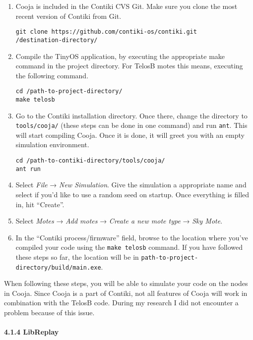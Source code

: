 \begin{enumerate}
\def\labelenumi{\arabic{enumi}.}
\item
  Cooja is included in the Contiki CVS Git. Make sure you clone the most
  recent version of Contiki from Git.

\begin{verbatim}
git clone https://github.com/contiki-os/contiki.git
/destination-directory/
\end{verbatim}
\item
  Compile the TinyOS application, by executing the appropriate make
  command in the project directory. For TelosB motes this means,
  executing the following command.

\begin{verbatim}
cd /path-to-project-directory/
make telosb
\end{verbatim}
\item
  Go to the Contiki installation directory. Once there, change the
  directory to \texttt{tools/cooja/} (these steps can be done in one
  command) and run \texttt{ant}. This will start compiling Cooja. Once
  it is done, it will greet you with an empty simulation environment.

\begin{verbatim}
cd /path-to-contiki-directory/tools/cooja/
ant run
\end{verbatim}
\item
  Select \emph{File} → \emph{New Simulation}. Give the simulation a
  appropriate name and select if you'd like to use a random seed on
  startup. Once everything is filled in, hit ``Create''.
\item
  Select \emph{Motes} → \emph{Add motes} → \emph{Create a new mote type}
  → \emph{Sky Mote}.
\item
  In the ``Contiki process/firmware'' field, browse to the location
  where you've compiled your code using the \texttt{make telosb}
  command. If you have followed these steps so far, the location will be
  in \texttt{path-to-project-directory/build/main.exe}.
\end{enumerate}

When following these steps, you will be able to simulate your code on
the nodes in Cooja. Since Cooja is a part of Contiki, not all features
of Cooja will work in combination with the TelosB code. During my
research I did not encounter a problem because of this issue.

\paragraph{4.1.4 LibReplay\\\\}\label{libreplay}

